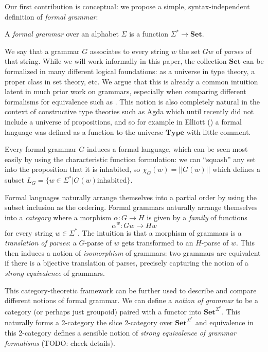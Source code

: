 \documentclass[sigconf,anonymous,review,screen]{acmart}
\newcommand{\Set}{\mathbf{Set}}
\newcommand{\Type}{\mathbf{Type}}
\begin{document}
Our first contribution is conceptual: we propose a simple,
syntax-independent definition of \emph{formal grammar}:
\begin{definition}
  A \emph{formal grammar} over an alphabet $\Sigma$ is a function
  $\Sigma^* \to \Set$.
\end{definition}
We say that a grammar $G$ associates to every string $w$ the set $Gw$
of \emph{parses} of that string. While we will work informally in this
paper, the collection $\Set$ can be formalized in many different
logical foundations: as a universe in type theory, a proper class in
set theory, etc. We argue that this is already a common intuition
latent in much prior work on grammars, especially when comparing
different formalisms for equivalence such as \cite{??}. This notion is
also completely natural in the context of constructive type theories
such as Agda which until recently did not include a universe of
propositions, and so for example in Elliott (\cite{??}) a formal
language was defined as a function to the universe $\Type$ with little
comment.

Every formal grammar $G$ induces a formal language, which can be seen
most easily by using the characteristic function formulation: we can
``squash'' any set into the proposition that it is inhabited, so
$\chi_G(w) = ||G(w)||$ which defines a subset $L_G = \{ w \in
\Sigma^*| G(w) \mathrm{inhabited}\}$.

Formal languages naturally arrange themselves into a partial order by
using the subset inclusion as the ordering. Formal grammars naturally
arrange themselves into a \emph{category} where a morphism $\alpha : G
\to H$ is given by a \emph{family} of functions
\[ \alpha^w : Gw \to Hw \]
for every string $w \in \Sigma^*$. The intuition is that a morphism of
grammars is a \emph{translation of parses}: a $G$-parse of $w$ gets
transformed to an $H$-parse of $w$. This then induces a notion of
\emph{isomorphism} of grammars: two grammars are equivalent if there
is a bijective translation of parses, precisely capturing the notion
of a \emph{strong equivalence} of grammars.

This category-theoretic framework can be further used to describe and
compare different notions of formal grammar. We can define a
\emph{notion of grammar} to be a category (or perhaps just groupoid)
paired with a functor into $\Set^{\Sigma^*}$. This naturally forms a
2-category the slice 2-category over $\Set^{\Sigma^*}$ and equivalence
in this 2-category defines a sensible notion of \emph{strong
equivalence of grammar formalisms} (TODO: check details).
\end{document}
